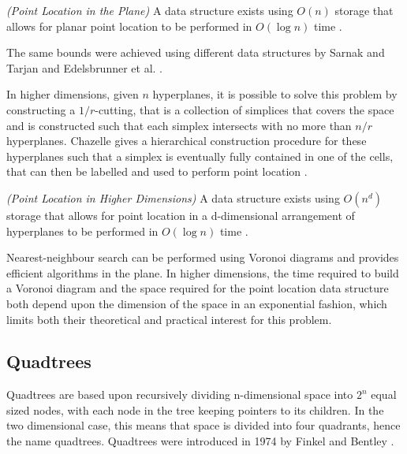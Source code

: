 \documentclass[mcs]{scsthesis}
\begin{document}
\begin{thm} \emph{(Point Location in the Plane)}
A data structure exists using \(O(n)\) storage that allows for planar
point location to be performed in \(O(\log n)\) time \cite{kirkpatrick}.
\end{thm}

The same bounds were achieved using different data structures by Sarnak and
Tarjan \cite{sarnak} and Edelsbrunner et al. \cite{edelsbrunner}.

In higher dimensions, given $n$ hyperplanes, it is possible to solve this problem
by constructing a \(1/r\)-cutting, that is a collection of simplices that
covers the space and is constructed such that each simplex intersects with no
more than \(n/r\) hyperplanes. Chazelle gives a hierarchical construction
procedure for these hyperplanes such that a simplex is eventually fully
contained in one of the cells, that can then be labelled and used to perform
point location \cite{chazelle}.

\begin{thm} \emph{(Point Location in Higher Dimensions)}
A data structure exists using \(O(n^d)\) storage that allows for  
point location in a d-dimensional arrangement of hyperplanes to be performed in
\(O(\log n)\) time \cite{chazelle}.
\end{thm}

Nearest-neighbour search can be performed using Voronoi diagrams and provides
efficient algorithms in the plane. In higher dimensions, the time required to
build a Voronoi diagram and the space required for the point location data
structure both depend upon the dimension of the space in an exponential fashion,
which limits both their theoretical and practical interest for this problem.

\subsection{Quadtrees}

Quadtrees are based upon recursively dividing n-dimensional space into \(2^n\)
equal sized nodes, with each node in the tree keeping pointers to its
children.  In the two dimensional case, this means that space is divided into
four quadrants, hence the name quadtrees. Quadtrees were introduced in 1974 by
Finkel and Bentley \cite{quadtree}. 
\end{document}
